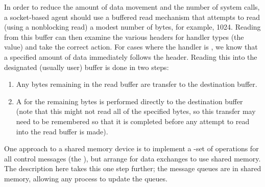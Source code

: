 \begin{mmadi}
\begin{tcp}
In order to reduce the amount of data movement and the number of system calls,
a socket-based agent should use a buffered read mechanism that attempts to
read (using a nonblocking read) a modest number of bytes, for example, 1024.
Reading from this buffer can then examine the various headers for handler
types (the  value) and take the correct action.
For cases where the handler is , we know that a
specified amount of data immediately follows the 
header.  Reading this into the designated (usually user) buffer is done in two
steps: 
\begin{enumerate}
\item Any bytes remaining in the read buffer are transfer to the destination
  buffer. 
\item A  for the remaining bytes is performed directly to the
  destination buffer (note that this might not read all of the specified
  bytes, so this transfer may need to be remembered so that it is completed
  before any attempt to read into the read buffer is made).
\end{enumerate}
\end{tcp}

\begin{shmem}

One approach to a shared memory device is to implement a \tcpname-set of
operations for all control messages (the ), but
arrange for data exchanges to use shared memory.  The description here takes
this one step further; the message queues are in shared memory, allowing any
process to update the queues.


\end{shmem}
\end{mmadi}
